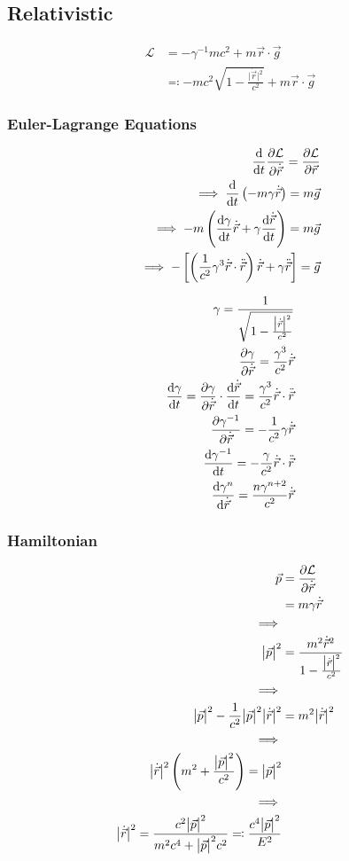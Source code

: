 \documentclass[12pt]{article}
\newcommand{\magsq}[1]{\big|#1\big|^2}
\newcommand{\Lag}{\mathcal{L}}
\newcommand{\pos}{\vec{r}}
\newcommand{\vel}{\dot{\vec{r}}}
\newcommand{\acc}{\ddot{\vec{r}}}
\newcommand{\mom}{\vec{p}}
\begin{document}
\subsection*{Relativistic}
\begin{align*}
    \Lag &= -\gamma^{-1} mc^2 + m\pos\cdot\vec{g} \\
    &\eqqcolon -mc^2\sqrt{1 - \frac{\magsq{\vel}}{c^2}} + m\pos\cdot\vec{g}
\end{align*}

\subsubsection*{Euler-Lagrange Equations}
\begin{align*}
    \dv{t}\pdv{\Lag}{\vel} = \pdv{\Lag}{\pos} \\
    \implies \dv{t}\left(-m\gamma\vel\right) = m\vec{g} \\
    \implies -m\left(\dv{\gamma}{t}\vel + \gamma\dv{\vel}{t} \right) = m\vec{g} \\
    \implies -\left[\left(\frac{1}{c^2}\gamma^3\vel\cdot\acc\right)\vel + \gamma\acc\right] = \vec{g}
\end{align*}

\begin{align*}
    \gamma = \frac{1}{\sqrt{1 - \frac{\magsq{\vel}}{c^2}}} \\
    \pdv{\gamma}{\vel} = \frac{\gamma^3}{c^2}\vel \\
    \dv{\gamma}{t} = \pdv{\gamma}{\vel}\cdot\dv{\vel}{t} = \frac{\gamma^3}{c^2} \vel\cdot\acc \\
    \pdv{\gamma^{-1}}{\vel} = -\frac{1}{c^2}\gamma\vel \\
    \dv{\gamma^{-1}}{t} = -\frac{\gamma}{c^2} \vel\cdot\acc \\
    \dv{\gamma^n}{\vel} = \frac{n\gamma^{n+2}}{c^2}\vel
\end{align*}

\subsubsection*{Hamiltonian}
\begin{align*}
    \mom &= \pdv{\Lag}{\vel} \\
    &= m\gamma\vel \\
    \implies \\
    \magsq{\mom} &= \frac{m^2\vel^2}{1 - \frac{\magsq{\vel}}{c^2}} \\
    \implies \\
    \magsq{\mom} - \frac{1}{c^2}\magsq{\mom}\magsq{\vel} &= m^2\magsq{\vel} \\
    \implies \\
    \magsq{\vel}\left(m^2 + \frac{\magsq{\mom}}{c^2}\right) = \magsq{\mom} \\
    \implies \\
    \magsq{\vel} = \frac{c^2\magsq{\mom}}{m^2c^4 + \magsq{\mom}c^2} \eqqcolon \frac{c^4\magsq{\mom}}{E^2}
\end{align*}
\end{document}
